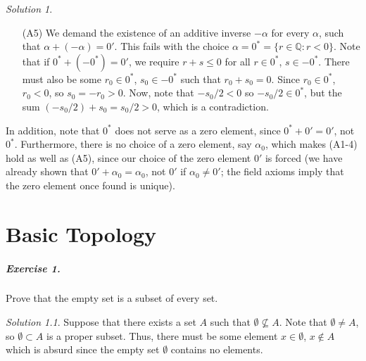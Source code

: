 \documentclass[11pt]{report}
\def\Q{\mathbb{Q}}
\theoremstyle{remark}
\newtheorem*{solution}{Solution}
\begin{document}
\begin{solution}
\begin{itemize}
            \item[(A5)] We demand the existence of an additive inverse $-\alpha$ for
            every $\alpha$, such that $\alpha + (-\alpha) = 0'$. This fails with the
            choice $\alpha = 0^* = \{r \in \Q: r < 0\}$. Note that if $0^* + (-0^*)
            = 0'$, we require $r + s \leq 0$ for all $r \in 0^*$, $s \in -0^*$.
            There must also be some $r_0 \in 0^*$, $s_0 \in -0^*$ such that $r_0 +
            s_0 = 0$. Since $r_0 \in 0^*$, $r_0 < 0$, so $s_0 = -r_0 > 0$.  Now,
            note that $-s_0 / 2 < 0$ so $-s_0 / 2 \in 0^*$, but the sum $(-s_0 / 2)
            + s_0 = s_0 / 2 > 0$, which is a contradiction.
        \end{itemize}

        In addition, note that $0^*$ does not serve as a zero element, since $0^* +
        0' = 0'$, not $0^*$. Furthermore, there is no choice of a zero element, say
        $\alpha_0$, which makes (A1-4) hold as well as (A5), since our choice of the
        zero element $0'$ is forced (we have already shown that $0' + \alpha_0 =
        \alpha_0$, not $0'$ if $\alpha_0 \neq 0'$; the field axioms imply that the
        zero element once found is unique).
    \end{solution}
    

    \chapter{Basic Topology}

    \paragraph{Exercise 1.} Prove that the empty set is a subset of every set.
    \begin{solution}
        Suppose that there exists a set $A$ such that $\emptyset \nsubseteq A$. Note
        that $\emptyset \neq A$, so $\emptyset \subset A$ is a proper subset. Thus,
        there must be some element $x \in \emptyset$, $x \notin A$ which is absurd
        since the empty set $\emptyset$ contains no elements.
    \end{solution}
\end{document}
